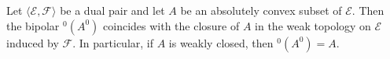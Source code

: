 Let $\langle \mathcal{E}, \mathcal{F} \rangle$ be a dual pair and let $A$ be an absolutely convex subset of $\mathcal{E}$. Then the bipolar $^0(A^0)$ coincides with the closure of $A$ in the weak topology on $\mathcal{E}$ induced by $\mathcal{F}$. In particular, if $A$ is weakly closed, then $^0(A^0) = A$.
